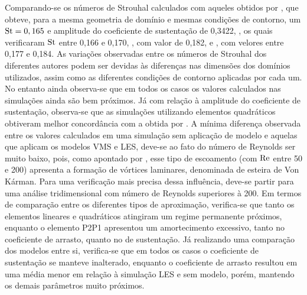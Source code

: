 Comparando-se os números de Strouhal calculados com aqueles obtidos por , que obteve, para a mesma geometria de domínio e mesmas condições de contorno, um $\mathrm{St}=0,165$ e amplitude do coeficiente de sustentação de 0,3422, , os quais verificaram $\mathrm{St}$ entre 0,166 e 0,170, , com valor de 0,182, e , com velores entre 0,177 e 0,184. As variações observadas entre os números de Strouhal dos diferentes autores podem ser devidas às diferenças nas dimensões dos domínios utilizados, assim como as diferentes condições de contorno aplicadas por cada um. No entanto ainda observa-se que em todos os casos os valores calculados nas simulações ainda são bem próximos. Já com relação à amplitude do coeficiente de sustentação, observa-se que as simulações utilizando elementos quadráticos obtiveram melhor concordância com a obtida por . A mínima diferença observada entre os valores calculados em uma simulação sem aplicação de modelo e aquelas que aplicam os modelos VMS e LES, deve-se ao fato do número de Reynolds ser muito baixo, pois, como apontado por , esse tipo de escoamento (com $\mathrm{Re}$ entre 50 e 200) apresenta a formação de vórtices laminares, denominada de esteira de Von Kárman. Para uma verificação mais precisa dessa influência, deve-se partir para uma análise tridimensional com número de Reynolds superiores à 200. Em termos de comparação entre os diferentes tipos de aproximação, verifica-se que tanto os elementos lineares e quadráticos atingiram um regime permanente próximos, enquanto o elemento P2P1 apresentou um amortecimento excessivo, tanto no coeficiente de arrasto, quanto no de sustentação. Já realizando uma comparação dos modelos entre si, verifica-se que em todos os casos o coeficiente de sustentação se manteve inalterado, enquanto o coeficiente de arrasto resultou em uma média menor em relação à simulação LES e sem modelo, porém, mantendo os demais parâmetros muito próximos.



